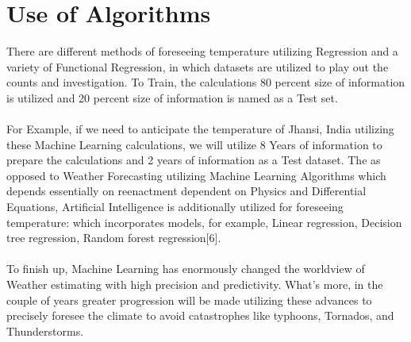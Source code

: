 \section{Use of Algorithms }
There are different methods of foreseeing temperature utilizing Regression and a variety of Functional Regression, in which datasets are utilized to play out the counts and investigation. To Train, the calculations 80 percent size of information is utilized and 20 percent size of information is named as a Test set. 
\\
\\
For Example, if we need to anticipate the temperature of Jhansi, India utilizing these Machine Learning calculations, we will utilize 8 Years of information to prepare the calculations and 2 years of information as a Test dataset. The as opposed to Weather Forecasting utilizing Machine Learning Algorithms which depends essentially on reenactment dependent on Physics and Differential Equations, Artificial Intelligence is additionally utilized for foreseeing temperature: which incorporates models, for example, Linear regression, Decision tree regression, Random forest regression[6].
\\
\\
To finish up, Machine Learning has enormously changed the worldview of Weather estimating with high precision and predictivity. What's more, in the  couple of years greater progression will be made utilizing these advances to precisely foresee the climate to avoid catastrophes like typhoons, Tornados, and Thunderstorms.
